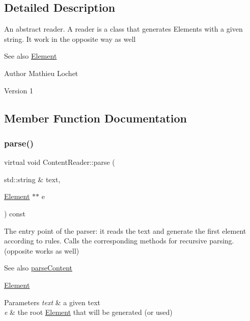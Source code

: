 \subsection{Detailed Description}
An abstract reader. A reader is a class that generates Elements with a given string. It work in the opposite way as well \begin{DoxySeeAlso}{See also}
\mbox{\hyperlink{classElement}{Element}}
\end{DoxySeeAlso}
\begin{DoxyAuthor}{Author}
Mathieu Lochet 
\end{DoxyAuthor}
\begin{DoxyVersion}{Version}
1 
\end{DoxyVersion}


\subsection{Member Function Documentation}
\mbox{\label{classContentReader_a7fff2e63a2e8fa216665604f69974e1d}} 
\subsubsection{\texorpdfstring{parse()}{parse()}}
{\footnotesize\ttfamily virtual void Content\+Reader\+::parse (\begin{DoxyParamCaption}\item[{std\+::string \&}]{text,  }\item[{\mbox{\hyperlink{classElement}{Element}} $\ast$$\ast$}]{e }\end{DoxyParamCaption}) const\hspace{0.3cm}{\ttfamily [pure virtual]}}

The entry point of the parser\+: it reads the text and generate the first element according to rules. Calls the corresponding methods for recursive parsing. (opposite works as well) \begin{DoxySeeAlso}{See also}
\mbox{\hyperlink{classContentReader_a7eef37b8b9761e21c0a3907ff94c72f7}{parse\+Content}} 

\mbox{\hyperlink{classElement}{Element}}
\end{DoxySeeAlso}

\begin{DoxyParams}{Parameters}
{\em text} & a given text \\
\hline
{\em e} & the root \mbox{\hyperlink{classElement}{Element}} that will be generated (or used) \\
\hline
\end{DoxyParams}


